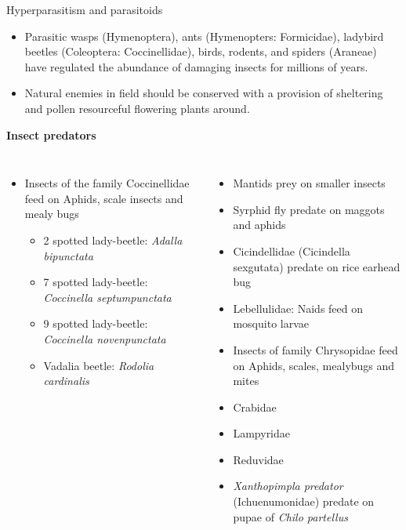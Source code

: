 \documentclass[11pt,dvipsnames,ignorenonframetext,aspectratio=169]{beamer}
\providecommand{\tightlist}{%
  \setlength{\itemsep}{0pt}\setlength{\parskip}{0pt}}
\newcommand{\bcolumns}{\begin{columns}[T, onlytextwidth]}
\newcommand{\ecolumns}{\end{columns}}
\begin{document}
\begin{frame}{Hyperparasitism and parasitoids}
\protect\hypertarget{hyperparasitism-and-parasitoids}{}
\small

\begin{itemize}
\tightlist
\item
  Parasitic wasps (Hymenoptera), ants (Hymenopters: Formicidae),
  ladybird beetles (Coleoptera: Coccinellidae), birds, rodents, and
  spiders (Araneae) have regulated the abundance of damaging insects for
  millions of years.
\item
  Natural enemies in field should be conserved with a provision of
  sheltering and pollen resourceful flowering plants around.
\end{itemize}

\textbf{Insect predators} \bcolumns {} \footnotesize

\begin{itemize}
\tightlist
\item
  Insects of the family Coccinellidae feed on Aphids, scale insects and
  mealy bugs

  \begin{itemize}
  \scriptsize
  \item 2 spotted lady-beetle: \textit{Adalla bipunctata}
  \item 7 spotted lady-beetle: \textit{Coccinella septumpunctata}
  \item 9 spotted lady-beetle: \textit{Coccinella novenpunctata}
  \item Vadalia beetle: \textit{Rodolia cardinalis}
  \end{itemize}
\end{itemize}

\scriptsize

\begin{itemize}
\tightlist
\item
  Mantids prey on smaller insects
\item
  Syrphid fly predate on maggots and aphids
\item
  Cicindellidae (Cicindella sexgutata) predate on rice earhead bug
\item
  Lebellulidae: Naids feed on mosquito larvae
\item
  Insects of family Chrysopidae feed on Aphids, scales, mealybugs and
  mites
\item
  Crabidae
\item
  Lampyridae
\item
  Reduvidae
\item
  \emph{Xanthopimpla predator} (Ichuenumonidae) predate on pupae of
  \emph{Chilo partellus}
\end{itemize}

\ecolumns
\end{frame}
\end{document}
